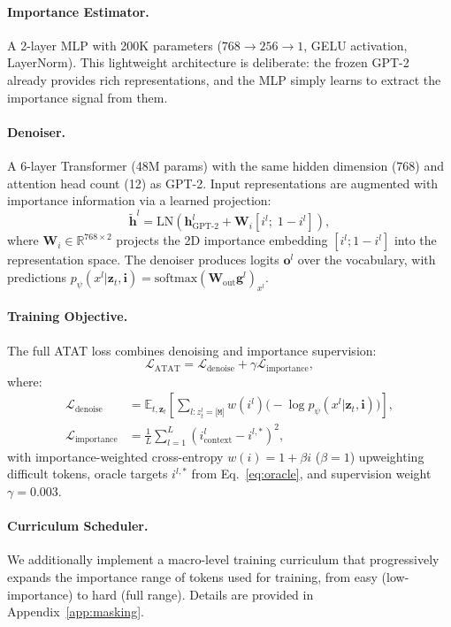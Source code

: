 \documentclass[11pt]{article}
\newcommand{\gL}{\mathcal{L}}
\newcommand{\rvz}{\mathbf{z}}
\newcommand{\rvi}{\mathbf{i}}
\newcommand{\rvh}{\mathbf{h}}
\newcommand{\E}{\mathbb{E}}
\newcommand{\R}{\mathbb{R}}
\newcommand{\softmax}{\text{softmax}}
\theoremstyle{remark}
\begin{document}
\paragraph{Importance Estimator.} A 2-layer MLP with 200K parameters ($768 \to 256 \to 1$, GELU activation, LayerNorm). This lightweight architecture is deliberate: the frozen GPT-2 already provides rich representations, and the MLP simply learns to extract the importance signal from them.

\paragraph{Denoiser.} A 6-layer Transformer (48M params) with the same hidden dimension (768) and attention head count (12) as GPT-2. Input representations are augmented with importance information via a learned projection:
\begin{equation}
    \tilde{\rvh}^l = \text{LN}\!\left(\rvh^l_{\text{GPT-2}} + \mathbf{W}_i[i^l;\; 1{-}i^l]\right),
\end{equation}
where $\mathbf{W}_i \in \R^{768 \times 2}$ projects the 2D importance embedding $[i^l; 1{-}i^l]$ into the representation space. The denoiser produces logits $\mathbf{o}^l$ over the vocabulary, with predictions $p_\psi(x^l|\rvz_t,\rvi) = \softmax(\mathbf{W}_{\text{out}}\mathbf{g}^l)_{x^l}$.

\paragraph{Training Objective.} The full ATAT loss combines denoising and importance supervision:
\begin{equation}
    \gL_{\text{ATAT}} = \gL_{\text{denoise}} + \gamma \gL_{\text{importance}},
    \label{eq:loss}
\end{equation}
where:
\begin{align}
    \gL_{\text{denoise}} &= \E_{t,\rvz_t}\!\left[\sum_{l:z_t^l=\texttt{[M]}} w(i^l)\bigl(-\log p_\psi(x^l|\rvz_t,\rvi)\bigr)\right], \label{eq:denoise-loss} \\
    \gL_{\text{importance}} &= \frac{1}{L}\sum_{l=1}^{L} \left(i^l_{\text{context}} - i^{l,*}\right)^2, \label{eq:imp-loss}
\end{align}
with importance-weighted cross-entropy $w(i) = 1 + \beta i$ ($\beta = 1$) upweighting difficult tokens, oracle targets $i^{l,*}$ from Eq.~\ref{eq:oracle}, and supervision weight $\gamma = 0.003$.

\paragraph{Curriculum Scheduler.} We additionally implement a macro-level training curriculum that progressively expands the importance range of tokens used for training, from easy (low-importance) to hard (full range). Details are provided in Appendix~\ref{app:masking}.
\end{document}
